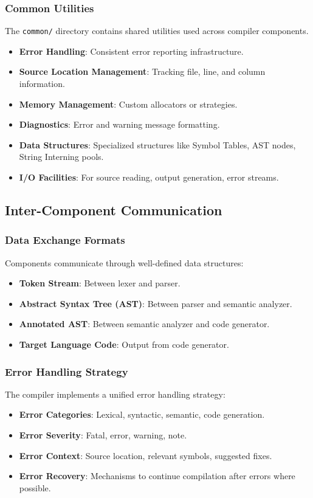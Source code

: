 \documentclass[conference]{IEEEtran}
\begin{document}
\subsubsection{Common Utilities}
The \texttt{common/} directory contains shared utilities used across compiler components.
\begin{itemize}
    \item \textbf{Error Handling}: Consistent error reporting infrastructure.
    \item \textbf{Source Location Management}: Tracking file, line, and column information.
    \item \textbf{Memory Management}: Custom allocators or strategies. %
    \item \textbf{Diagnostics}: Error and warning message formatting.
    \item \textbf{Data Structures}: Specialized structures like Symbol Tables, AST nodes, String Interning pools.
    \item \textbf{I/O Facilities}: For source reading, output generation, error streams.
\end{itemize}

\subsection{Inter-Component Communication}

\subsubsection{Data Exchange Formats}
Components communicate through well-defined data structures:
\begin{itemize}
    \item \textbf{Token Stream}: Between lexer and parser.
    \item \textbf{Abstract Syntax Tree (AST)}: Between parser and semantic analyzer.
    \item \textbf{Annotated AST}: Between semantic analyzer and code generator.
    \item \textbf{Target Language Code}: Output from code generator.
\end{itemize}

\subsubsection{Error Handling Strategy} %
The compiler implements a unified error handling strategy:
\begin{itemize}
    \item \textbf{Error Categories}: Lexical, syntactic, semantic, code generation.
    \item \textbf{Error Severity}: Fatal, error, warning, note.
    \item \textbf{Error Context}: Source location, relevant symbols, suggested fixes.
    \item \textbf{Error Recovery}: Mechanisms to continue compilation after errors where possible.
\end{itemize}
\end{document}
